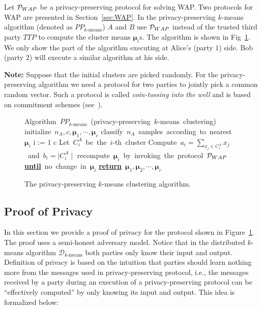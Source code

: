 Let ${\cal P}_{WAP}$ be a privacy-preserving protocol for solving
WAP. Two protocols for WAP are presented in Section~\ref{sec:WAP}.  In
the privacy-preserving $k$-means algorithm (denoted as
$PP_{\mbox{$k$-means}}$) $A$ and $B$ use ${\cal P}_{WAP}$ instead of
the trusted third party $TTP$ to compute the cluster means
$\mathbf{\mu}_i$s.  The algorithm is shown in
Fig~\ref{fig:pp-k-means}. We only show the part of the algorithm
executing at Alice's (party $1$) side. Bob (party $2$) will execute a
similar algorithm at his side.

\noindent
{\bf Note:} Suppose that the initial clusters are picked randomly. For
the privacy-preserving algorithm we need a protocol for two parties to
jointly pick a common random vector. Such a protocol is called {\it
coin-tossing into the well} and is based on commitment schemes
(see~\cite[Section 7.4.3.1]{Goldreich:vol2}).

\begin{figure}
\begin{center}
\begin{programbox}
\mbox{Algorithm $PP_{\mbox{$k$-means}}$ (privacy-preserving $k$-means clustering)}
\BEGIN \mbox{initialize $n_A ,c,\mathbf{\mu}_1,\cdots,\mathbf{\mu}_c$}
	\DO \mbox{classify $n_A$ samples according to nearest $\mathbf{\mu}_i$}
	    \FOR i := 1 \TO c  \DO
	     \mbox{Let $C_i^A$ be the $i$-th cluster}
	     \mbox{Compute $a_i = \sum_{x_j \in C_i^A } x_j$ and $b_i = \mid C_i^A \mid$}
	     \mbox{recompute $\mathbf{\mu}_i$ by invoking the protocol ${\cal P}_{WAP}$ }
	    \OD
	\mbox{{\bf \underline{until}} no change in $\mathbf{\mu}_i$}
 \mbox{{\bf \underline{return}} $\mathbf{\mu}_1,\mathbf{\mu}_2,\cdots,\mathbf{\mu}_c$}
\END
\end{programbox}
\end{center}
\caption{The privacy-preserving $k$-means clustering algorithm.}
\label{fig:pp-k-means}
\end{figure}

\subsection{Proof of Privacy}

In this section we provide a proof of privacy for the protocol shown
in Figure~\ref{fig:pp-k-means}.  The proof uses a semi-honest
adversary model. Notice that in the distributed $k$-means algorithm
$\mathcal{D}_{\mbox{$k$-means}}$ both parties only know their input
and output.  Definition of privacy is based on the intuition that
parties should learn nothing more from the messages used in
privacy-preserving protocol, i.e., the messages received by a party
during an execution of a privacy-preserving protocol can be
``effectively computed'' by only knowing its input and output. This
idea is formalized below:

